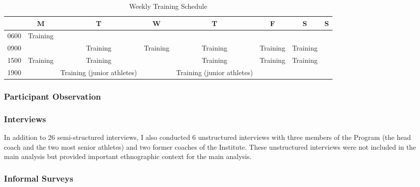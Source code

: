 \begin{CJK}{UTF8}{gbsn}
    \begin{landscape}
      \begin{table}[htpb]\caption{Weekly Training Schedule}
        \begin{center}
          \begin{small}
              \begin{tabular}{| c | c | c | c | c | c | c | c |}
                \hline
                & \bf M & \bf T & \bf W & \bf T & \bf F & \bf S & \bf S \\
                \hline
                0600 & Training &  &  & & & & \\
                \hline
                0900 &  & Training & Training & Training & Training & Training &  \\
                  \hline
                1500 & Training & Training & & Training & Training & Training &  \\
                  \hline
                1900 &  & Training (junior athletes) & & Training (junior athletes) & & & \\
                   \hline
              \end{tabular}
                  \label{tab:tournamentData}
            \end{small}
          \end{center}
        \end{table}
    \end{landscape}
    \restoregeometry




  \subsubsection{Participant Observation}

    \subsubsection{Interviews}

    In addition to 26 semi-structured interviews, I also conducted 6 unstructured interviews with three members of the Program (the head coach and the two most senior athletes) and two former coaches of the Institute.  These unstructured interviews were not included in the main analysis but provided important ethnographic context for the main analysis.

    \subsubsection{Informal Surveys}


\end{CJK}
